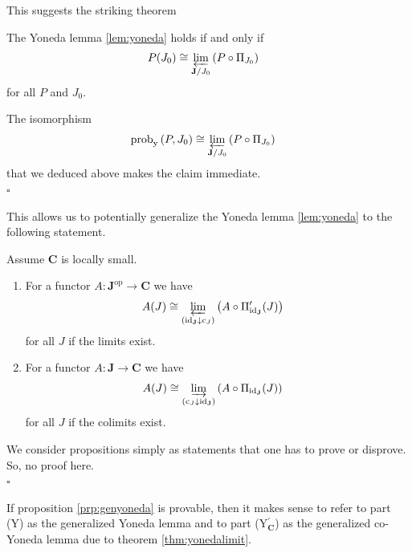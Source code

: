 This suggests the striking theorem
\\
\begin{thm}
\label{thm:yonedalimit}
The Yoneda lemma \ref{lem:yoneda} holds if and only if
\begin{align*}
  P(J_{0})
  &\cong
  \varprojlim_{\mathbf{J} \slash J_{0}}
  \left(
    P
    \circ
    \Pi_{J_{0}}
  \right)
\end{align*}
for all $P$ and $J_{0}$.
\end{thm}
\begin{prf}
The isomorphism
\begin{align*}
  \mathrm{prob}_{\mathrm{y}}
  \left(
    P,
    J_{0}
  \right)
  &\cong
  \varprojlim_{\mathbf{J} \slash J_{0}}
  \left(
    P
    \circ
    \Pi_{J_{0}}
  \right)
\end{align*}
that we deduced above makes the claim immediate.
\\
\phantom{proven}
\hfill
$\square$
\end{prf}
This allows us to potentially generalize the Yoneda lemma \ref{lem:yoneda} to the following statement.
\\
\begin{prp}
\label{prp:genyoneda}
Assume $\mathbf{C}$ is locally small.
\begin{enumerate}
\item[(Y)]
For a functor $A \colon \mathbf{J}^{\textrm{op}} \to \mathbf{C}$ we have
\begin{align*}
  A(J)
  &\cong
  \varprojlim_{(\mathrm{id}_{\mathbf{J}} \downarrow \mathrm{c}_{J})}
  \left(
    A
    \circ
    \Pi_{\mathrm{id}_{\mathbf{J}}}^{\prime}(J)
  \right)
\end{align*}
for all $J$ if the limits exist.
\item[(Y$_{\mathbf{C}}^{\prime}$)]
For a functor $A \colon \mathbf{J} \to \mathbf{C}$ we have
\begin{align*}
  A(J)
  &\cong
  \varinjlim_{(\mathrm{c}_{J} \downarrow \mathrm{id}_{\mathbf{J}})}
  \left(
    A
    \circ
    \Pi_{\mathrm{id}_{\mathbf{J}}}(J)
  \right)
\end{align*}
for all $J$ if the colimits exist.
\end{enumerate}
\end{prp}
\begin{prf}
We consider propositions simply as statements that one has to prove or disprove.
So, no proof here.
\\
\phantom{proven}
\hfill
$\square$
\end{prf}
If proposition \ref{prp:genyoneda} is provable, then it makes sense to refer to part (Y) as the generalized Yoneda lemma and to part (Y$_{\mathbf{C}}^{\prime}$) as the generalized co-Yoneda lemma due to theorem \ref{thm:yonedalimit}.
